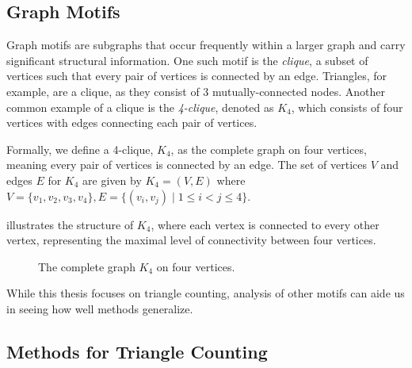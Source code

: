 \documentclass[11pt, margin=1in]{article}
\begin{document}
\subsection{Graph Motifs}

Graph motifs are subgraphs that occur frequently within a larger graph and carry significant structural information.
One such motif is the \emph{clique}, a subset of vertices such that every pair of vertices is connected by an edge.
Triangles, for example, are a clique, as they consist of 3 mutually-connected nodes.
Another common example of a clique is the \emph{4-clique}, denoted as \( K_4 \), which consists of four vertices with edges connecting each pair of vertices.

Formally, we define a 4-clique, \( K_4 \), as the complete graph on four vertices, meaning every pair of vertices is connected by an edge. The set of vertices \( V \) and edges \( E \) for \( K_4 \) are given by $K_4 = (V, E)$ where $V = \{ v_1, v_2, v_3, v_4 \}, E = \{ (v_i, v_j) \mid 1 \leq i < j \leq 4 \}$.

 illustrates the structure of \( K_4 \), where each vertex is connected to every other vertex, representing the maximal level of connectivity between four vertices.

\begin{figure}[H]
    \centering
    \caption{The complete graph \( K_4 \) on four vertices.}
    \label{fig:k4}
\end{figure}

While this thesis focuses on triangle counting, analysis of other motifs can aide us in seeing how well methods generalize.

\subsection{Methods for Triangle Counting}
\label{sec:exact-counting}
\end{document}
